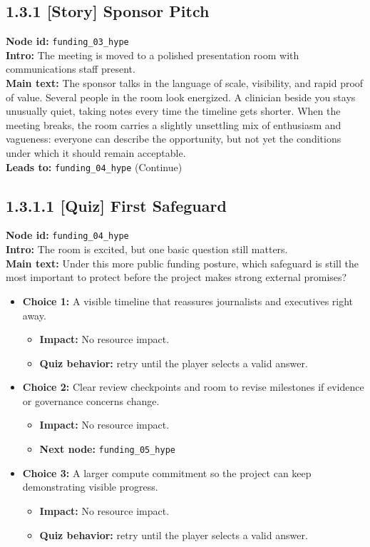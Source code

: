 \documentclass[11pt]{article}
\begin{document}
\subsection*{1.3.1 [Story] Sponsor Pitch}
\textbf{Node id:} \texttt{funding\_03\_hype}\\
\textbf{Intro:} The meeting is moved to a polished presentation room with communications staff present.\\
\textbf{Main text:} The sponsor talks in the language of scale, visibility, and rapid proof of value. Several people in the room look energized. A clinician beside you stays unusually quiet, taking notes every time the timeline gets shorter. When the meeting breaks, the room carries a slightly unsettling mix of enthusiasm and vagueness: everyone can describe the opportunity, but not yet the conditions under which it should remain acceptable.\\
\textbf{Leads to:} \texttt{funding\_04\_hype} (Continue)\\
\subsection*{1.3.1.1 [Quiz] First Safeguard}
\textbf{Node id:} \texttt{funding\_04\_hype}\\
\textbf{Intro:} The room is excited, but one basic question still matters.\\
\textbf{Main text:} Under this more public funding posture, which safeguard is still the most important to protect before the project makes strong external promises?\\
\begin{itemize}
\item \textbf{Choice 1:} A visible timeline that reassures journalists and executives right away.
\begin{itemize}
\item \textbf{Impact:} No resource impact.
\item \textbf{Quiz behavior:} retry until the player selects a valid answer.
\end{itemize}
\item \textbf{Choice 2:} Clear review checkpoints and room to revise milestones if evidence or governance concerns change.
\begin{itemize}
\item \textbf{Impact:} No resource impact.
\item \textbf{Next node:} \texttt{funding\_05\_hype}
\end{itemize}
\item \textbf{Choice 3:} A larger compute commitment so the project can keep demonstrating visible progress.
\begin{itemize}
\item \textbf{Impact:} No resource impact.
\item \textbf{Quiz behavior:} retry until the player selects a valid answer.
\end{itemize}
\end{itemize}
\end{document}
